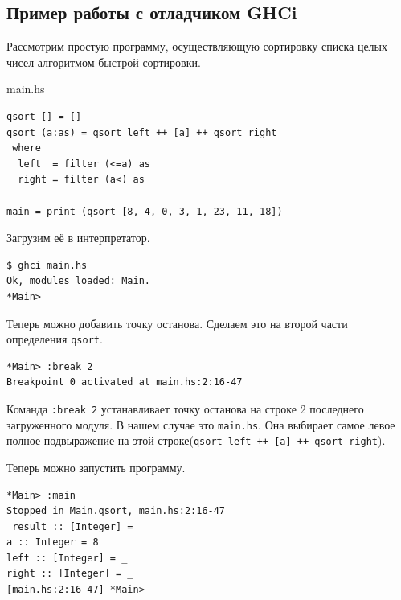 \documentclass[fontsize=14pt, paper=a4, pagesize, DIV=calc]{scrartcl}
\def\code#1{\texttt{#1}}
\begin{document}
\subsection{Пример работы с отладчиком GHCi}

Рассмотрим простую программу, осуществляющую сортировку списка целых чисел
алгоритмом быстрой сортировки.

\begin{ListingEnv}
\caption{main.hs}
\begin{lstlisting}
qsort [] = []
qsort (a:as) = qsort left ++ [a] ++ qsort right
 where 
  left  = filter (<=a) as
  right = filter (a<) as

main = print (qsort [8, 4, 0, 3, 1, 23, 11, 18])
\end{lstlisting}
\end{ListingEnv}

Загрузим её в интерпретатор.

\begin{ListingEnv}
\caption{}
\begin{lstlisting}[numbers=none]
$ ghci main.hs
Ok, modules loaded: Main.
*Main>
\end{lstlisting}
\end{ListingEnv}

Теперь можно добавить точку останова. Сделаем это на второй части определения
\code{qsort}.

\begin{ListingEnv}
\caption{}
\begin{lstlisting}[numbers=none]
*Main> :break 2
Breakpoint 0 activated at main.hs:2:16-47
\end{lstlisting}
\end{ListingEnv}

Команда \code{:break 2} устанавливает точку останова на строке 2 последнего
загруженного модуля. В нашем случае это \code{main.hs}. Она выбирает самое
левое полное подвыражение на этой строке(\code{qsort left ++ [a] ++ qsort
right}).

Теперь можно запустить программу.

\begin{ListingEnv}
\caption{}
\begin{lstlisting}[numbers=none]
*Main> :main
Stopped in Main.qsort, main.hs:2:16-47
_result :: [Integer] = _
a :: Integer = 8
left :: [Integer] = _
right :: [Integer] = _
[main.hs:2:16-47] *Main> 
\end{lstlisting}
\end{ListingEnv}
\end{document}
